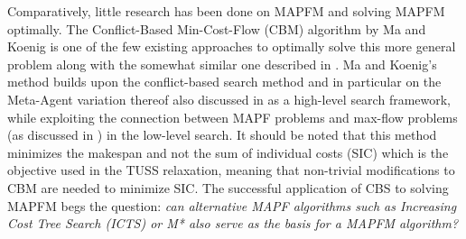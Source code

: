 \documentclass[english,10pt]{article}
\begin{document}
	Comparatively, little research has been done on MAPFM and solving MAPFM optimally.
	The Conflict-Based Min-Cost-Flow (CBM) algorithm by Ma and Koenig \cite{ma2016} is one of the few existing approaches to optimally solve this more general problem along with the somewhat similar one described in \cite{henkel2019}.
	Ma and Koenig's method builds upon the conflict-based search method and in particular on the Meta-Agent variation thereof also discussed in \cite{sharon2015} as a high-level search framework, while exploiting the connection between MAPF problems and max-flow problems (as discussed in \cite{yu2013}) in the low-level search. It should be noted that this method minimizes the makespan and not the sum of individual costs (SIC) which is the objective used in the TUSS relaxation, meaning that non-trivial modifications to CBM are needed to minimize SIC.
	The successful application of CBS to solving MAPFM begs the question: \textit{can alternative MAPF algorithms such as Increasing Cost Tree Search (ICTS) \cite{sharon2011} or M* \cite{wagner2011} also serve as the basis for a MAPFM algorithm?}
	
\end{document}
